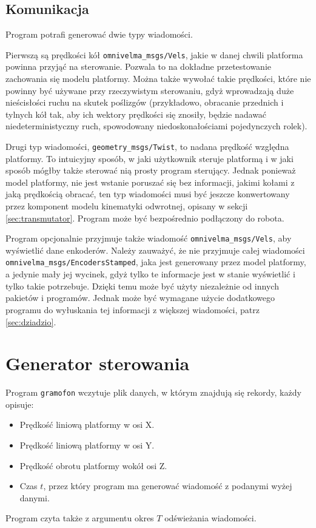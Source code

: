 	\subsection{Komunikacja}
		Program potrafi generować dwie typy wiadomości.
		
		Pierwszą są prędkości kół \texttt{omnivelma\_msgs/Vels}, jakie w danej chwili platforma powinna przyjąć na sterowanie.
		Pozwala to na dokładne przetestowanie zachowania się modelu platformy.
		Można także wywołać takie prędkości, które nie powinny być używane przy rzeczywistym sterowaniu, gdyż wprowadzają duże nieścisłości ruchu na skutek poślizgów
		(przykładowo, obracanie przednich i tylnych kół tak, aby ich wektory prędkości się znosiły, będzie nadawać niedeterministyczny ruch, spowodowany niedoskonałościami
		pojedynczych rolek).
		
		Drugi typ wiadomości, \texttt{geometry\_msgs/Twist}, to nadana prędkość względna platformy.
		To intuicyjny sposób, w jaki użytkownik steruje platformą i w jaki sposób mógłby także sterować nią prosty program sterujący.
		Jednak ponieważ model platformy, nie jest wstanie poruszać się bez informacji, jakimi kołami z jaką prędkością obracać,
		ten typ wiadomości musi być jeszcze konwertowany przez komponent modelu kinematyki odwrotnej, opisany w sekcji \ref{sec:transmutator}.
		Program może być bezpośrednio podłączony do robota.
		
		Program opcjonalnie przyjmuje także wiadomość \texttt{omnivelma\_msgs/Vels}, aby wyświetlić dane enkoderów.
		Należy zauważyć, że nie przyjmuje całej wiadomości \texttt{omnivelma\_msgs/EncodersStamped}, jaka jest generowany przez model platformy,
		a jedynie mały jej wycinek, gdyż tylko te informacje jest w stanie wyświetlić i tylko takie potrzebuje.
		Dzięki temu może być użyty niezależnie od innych pakietów i programów. Jednak może być wymagane użycie dodatkowego programu do 
		wyłuskania tej informacji z większej wiadomości,
		patrz \ref{sec:dziadzio}.
		
	
\section{Generator sterowania}
	Program \texttt{gramofon} wczytuje plik danych, w którym znajdują się rekordy, każdy opisuje:
	\begin{itemize}
		\item Prędkość liniową platformy w osi X.
		\item Prędkość liniową platformy w osi Y.
		\item Prędkość obrotu platformy wokół osi Z.
		\item Czas $t$, przez który program ma generować wiadomość z podanymi wyżej danymi.
	\end{itemize}
	Program czyta także z argumentu okres $T$ odświeżania wiadomości.
	
